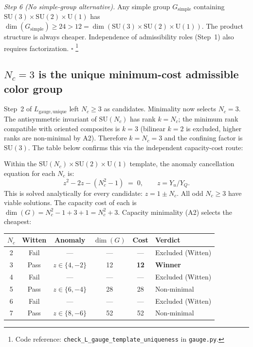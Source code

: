 \documentclass[11pt]{article}
\newcommand{\coderef}[2]{\footnote{Code reference: \texttt{#1} in \texttt{#2}.}}
\newcommand{\SU}{\mathrm{SU}}
\newcommand{\U}{\mathrm{U}}
\begin{document}
\begin{tcolorbox}[apfbox, title={Lemma $L_{\mathrm{gauge,unique}}$ (Gauge Template Uniqueness)}]
\medskip\noindent\textit{Step 6 (No simple-group alternative).}  Any simple group $G_{\mathrm{simple}}$ containing $\SU(3) \times \SU(2) \times \U(1)$ has $\dim(G_{\mathrm{simple}}) \ge 24 > 12 = \dim(\SU(3) \times \SU(2) \times \U(1))$.  The product structure is always cheaper.  Independence of admissibility roles (Step~1) also requires factorization.  $\square$
\coderef{check\_L\_gauge\_template\_uniqueness}{gauge.py}
\end{tcolorbox}

\subsection{$N_c = 3$ is the unique minimum-cost admissible color group}

Step~2 of $L_{\mathrm{gauge,unique}}$ left $N_c \ge 3$ as candidates.  Minimality now selects $N_c = 3$.  The antisymmetric invariant of $\SU(N_c)$ has rank $k = N_c$; the minimum rank compatible with oriented composites is $k = 3$ (bilinear $k=2$ is excluded, higher ranks are non-minimal by A2).  Therefore $k = N_c = 3$ and the confining factor is $\SU(3)$.  The table below confirms this via the independent capacity-cost route:

Within the $\SU(N_c) \times \SU(2) \times \U(1)$ template, the anomaly cancellation equation for each $N_c$ is:
\begin{equation}
z^2 - 2z - (N_c^2 - 1) \;=\; 0, \qquad z = Y_u / Y_Q.
\label{eq:anomaly_cancel}
\end{equation}
This is solved analytically for every candidate: $z = 1 \pm N_c$.  All odd $N_c \ge 3$ have viable solutions.  The capacity cost of each is $\dim(G) = N_c^2 - 1 + 3 + 1 = N_c^2 + 3$.  Capacity minimality (A2) selects the cheapest:

\begin{center}
\small
\begin{tabular}{cccccl}
\toprule
$N_c$ & Witten & Anomaly & $\dim(G)$ & Cost & Verdict \\
\midrule
2 & Fail & --- & --- & --- & Excluded (Witten) \\
3 & Pass & $z \in \{4, -2\}$ & 12 & \textbf{12} & \textbf{Winner} \\
4 & Fail & --- & --- & --- & Excluded (Witten) \\
5 & Pass & $z \in \{6, -4\}$ & 28 & 28 & Non-minimal \\
6 & Fail & --- & --- & --- & Excluded (Witten) \\
7 & Pass & $z \in \{8, -6\}$ & 52 & 52 & Non-minimal \\
\bottomrule
\end{tabular}
\end{center}
\end{document}
